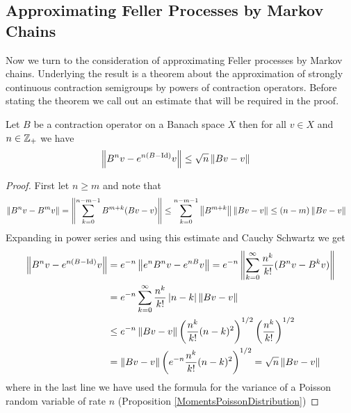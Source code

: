 \subsection{Approximating Feller Processes by Markov Chains}

Now we turn to the consideration of approximating Feller processes by Markov chains.  Underlying the result is a theorem about the approximation of strongly continuous contraction semigroups by powers of contraction operators.   Before stating the theorem we call out an estimate that will be required in the proof.

\begin{lem}\label{KurtzDiscreteTimeSemigroupConvergenceEstimate}Let $B$ be a contraction operator on a Banach space $X$ then for all $v \in X$ and $n \in \mathbb{Z}_+$ we have
\begin{align*}
\left \lVert B^n v - e^{n(B - \operatorname*{Id})} v \right \rVert &\leq \sqrt{n} \left \lVert Bv - v \right \rVert
\end{align*}
\end{lem}
\begin{proof}
First let $n \geq m$ and note that
\begin{align*}
\left \lVert B^n v - B^m v \right \rVert &= \left \lVert \sum_{k=0}^{n-m-1} B^{m+k} (B v - v) \right \rVert \leq \sum_{k=0}^{n-m-1} \left \lVert B^{m+k} \right \rVert \left \lVert B v - v \right \rVert \leq (n-m) \left \lVert Bv-v \right \rVert
\end{align*}
Expanding in power series and using this estimate and Cauchy Schwartz we get
\begin{align*}
\left \lVert B^n v - e^{n(B - \operatorname*{Id})} v \right \rVert &= e^{-n} \left \lVert e^n B^n v - e^{nB} v \right \rVert 
= e^{-n} \left \lVert \sum_{k=0}^\infty \frac{n^k}{k!} (B^n v - B^k v) \right \rVert \\
&= e^{-n} \sum_{k=0}^\infty \frac{n^k}{k!} \left \vert n-k \right \vert \left \lVert B v - v \right \rVert \\
&\leq e^{-n} \left \lVert B v - v \right \rVert \left( \frac{n^k}{k!} (n-k)^2\right)^{1/2} \left( \frac{n^k}{k!} \right)^{1/2} \\
&=\left \lVert B v - v \right \rVert \left( e^{-n} \frac{n^k}{k!} (n-k)^2\right)^{1/2} = \sqrt{n} \left \lVert Bv-v \right \rVert\\
\end{align*}
where in the last line we have used the formula for the variance of a Poisson random variable of rate $n$ (Proposition \ref{MomentsPoissonDistribution})
\end{proof}

